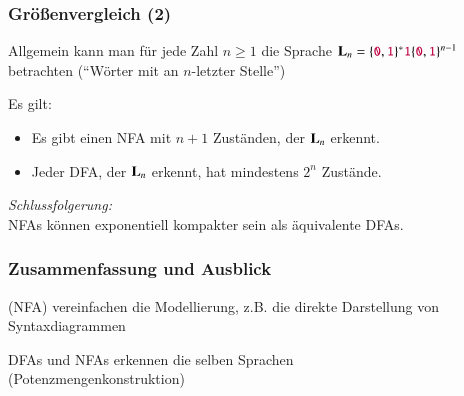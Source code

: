 \documentclass[onlymath]{beamer}
\begin{document}
\begin{frame}\frametitle{Größenvergleich (2)}

Allgemein kann man für jede Zahl $n\geq 1$ die Sprache $\textbf{\textcolor{black}{L}}_n= \{\mathtt{\textcolor{purple}{0}},\mathtt{\textcolor{purple}{1}}\}^* \mathtt{\textcolor{purple}{1}} \{\mathtt{\textcolor{purple}{0}},\mathtt{\textcolor{purple}{1}}\}^{n-1} $ betrachten ("`Wörter mit  an $n$-letzter Stelle"')
\medskip

Es gilt:
\begin{itemize}
\item Es gibt einen NFA mit $n+1$ Zuständen, der $\textbf{\textcolor{black}{L}}_n$ erkennt.
\item Jeder DFA, der $\textbf{\textcolor{black}{L}}_n$ erkennt, hat mindestens $2^n$ Zustände.
\end{itemize}

\bigskip

\emph{Schlussfolgerung:}\\
\alert{NFAs können exponentiell kompakter sein als äquivalente DFAs.}

\end{frame}
% 
% 
% 
% 
% 
% 

\begin{frame}\frametitle{Zusammenfassung und Ausblick}

 (NFA) vereinfachen die Modellierung, z.B. die direkte Darstellung von Syntaxdiagrammen
\bigskip

 DFAs und NFAs erkennen die selben Sprachen\\
\textcolor{devilscss}{(Potenzmengenkonstruktion)}
\bigskip



\end{frame}
\end{document}
